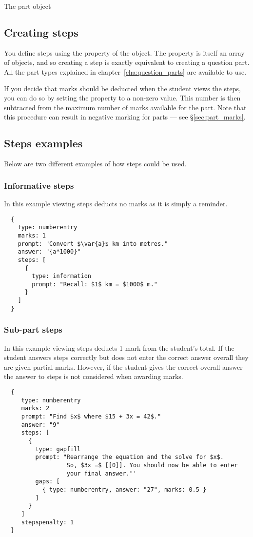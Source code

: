 \begin{chapter}{\label{cha:part_object}The part object}
  \subsection{Creating steps}
  You define steps using the  property of the 
  object.  The  property is itself an array of
   objects, and so creating a step is exactly equivalent to
  creating a question part.  All the part types explained in
  chapter~\ref{cha:question_parts} are available to use.

  If you decide that marks should be deducted when the student views the
  steps, you can do so by setting the  property to a
  non-zero value.  This number is then subtracted from the maximum number of
  marks available for the part.  Note that this procedure can result in
  negative marking for parts --- see \S\ref{sec:part_marks}.
  
  \subsection{Steps examples}
  Below are two different examples of how steps could be used.
  
  \subsubsection{Informative steps}
  In this example viewing steps deducts no marks as it is simply a reminder.
  \begin{Verbatim}
  {
    type: numberentry
    marks: 1
    prompt: "Convert $\var{a}$ km into metres."
    answer: "{a*1000}"
    steps: [
      {
        type: information
        prompt: "Recall: $1$ km = $1000$ m."
      }
    ]		
  } 
  \end{Verbatim}
  
  \subsubsection{Sub-part steps}  
  In this example viewing steps deducts 1 mark from the student's total. If the
  student answers steps correctly but does not enter the correct answer overall
  they are given partial marks.  However, if the student gives the correct
  overall answer the answer to steps is not considered when awarding marks. 
  \begin{Verbatim}
  {
     type: numberentry
     marks: 2
     prompt: "Find $x$ where $15 + 3x = 42$."
     answer: "9"
     steps: [
       {
         type: gapfill
  	     prompt: "Rearrange the equation and the solve for $x$. 
  	              So, $3x =$ [[0]]. You should now be able to enter
  	              your final answer."'
  	     gaps: [
  	       { type: numberentry, answer: "27", marks: 0.5 }
  	     ]
       }
     ]
     stepspenalty: 1
  }				
  \end{Verbatim}	
  
\end{chapter}
